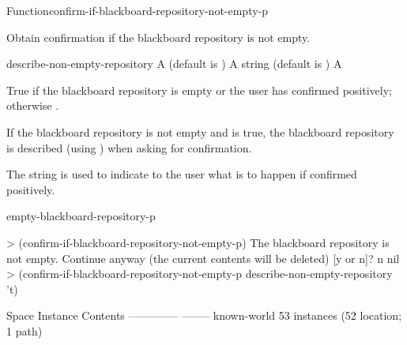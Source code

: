 \documentclass[10pt,twoside,english,pdftex]{article}
\begin{document}

\begin{functiondoc}{Function}{confirm-if-blackboard-repository-not-empty-p}{%
    }
%

\fnsyntax 

\fnpurpose Obtain confirmation if the blackboard repository is not empty.

\fnpackage {}

\fnmodule {}

\fnargs
\begin{args}{describe-non-empty-repository}
 A  (default is \nil)
 A string (default is )
\arg[boolean] A 
\end{args}

\fnreturns True if the blackboard repository is empty or the user has
confirmed positively; otherwise \nil.

\fndescription
%
If the blackboard repository is not empty and
 is true, the blackboard
repository is described (using
) when asking for
confirmation.

The  string is used to indicate to the user what
is to happen if confirmed positively.

\begin{alsos}{empty-blackboard-repository-p}
\end{alsos}

\fnexamples 
%
\W\supp
\begin{example}
  > (confirm-if-blackboard-repository-not-empty-p)
  The blackboard repository is not empty.
  Continue anyway (the current contents will be deleted) [y or n]? n
  nil
  > (confirm-if-blackboard-repository-not-empty-p 
       describe-non-empty-repository 't)

  Space Instance                        Contents
  --------------                        --------
  known-world                           53 instances (52 location; 1 path)


\end{example}
\end{functiondoc}
\end{document}
